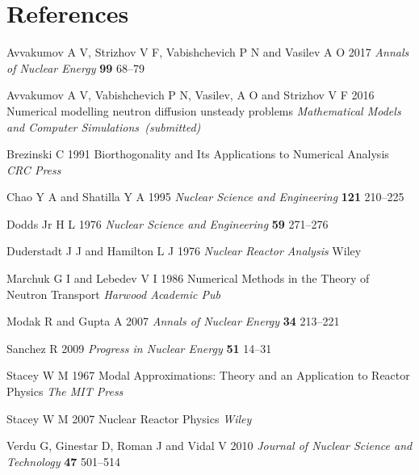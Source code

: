 \documentclass[a4paper]{jpconf}
\begin{document}
\section*{References}
\begin{thebibliography}{50}
Avvakumov A V, Strizhov V F, Vabishchevich P N and Vasilev A O 2017
{\it Annals of Nuclear Energy} {\bf 99} 68--79

Avvakumov A V, Vabishchevich P N, Vasilev, A O and Strizhov V F 2016
Numerical modelling neutron diffusion unsteady problems
{\it Mathematical Models and Computer Simulations~(submitted)}

Brezinski C 1991
Biorthogonality and Its Applications to Numerical Analysis 
{\it CRC Press}

Chao Y A and Shatilla Y A 1995
{\it Nuclear Science and  Engineering} {\bf 121} 210--225

Dodds Jr H L 1976
{\it Nuclear Science and Engineering} {\bf 59} 271--276

Duderstadt J J and Hamilton L J 1976
{\it Nuclear Reactor Analysis} Wiley

Marchuk G I and Lebedev V I 1986
Numerical Methods in the Theory of Neutron Transport
{\it Harwood Academic Pub}

Modak R and Gupta A 2007
{\it Annals of Nuclear Energy} {\bf 34} 213--221

Sanchez R 2009
{\it Progress in Nuclear Energy} {\bf 51} 14--31

Stacey W M 1967
Modal Approximations: Theory and an Application to Reactor Physics
{\it The MIT Press}

Stacey W M 2007
Nuclear Reactor Physics
{\it Wiley}

Verdu G, Ginestar D, Roman J and Vidal V 2010
{\it Journal of Nuclear Science and Technology} {\bf 47} 501--514
\end{thebibliography}
\end{document}
